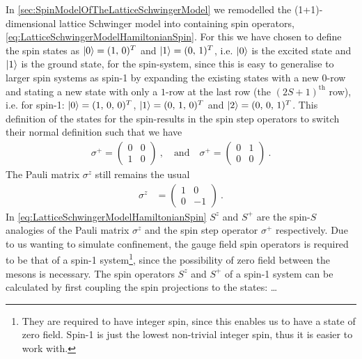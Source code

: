\documentclass[../main.tex]{subfiles} %
\begin{document}
In \cref{sec:SpinModelOfTheLatticeSchwingerModel} we remodelled the (1+1)-dimensional lattice Schwinger model into containing spin operators, \cref{eq:LatticeSchwingerModelHamiltonianSpin}.
For this we have chosen to define the spin states as $\ket{0} = (1,\, 0)^T$ and $\ket{1} = (0,\, 1)^T$, i.e. $\ket{0}$ is the excited state and $\ket{1}$ is the ground state, for the spin-\half system, since this is easy to generalise to larger spin systems as spin-1 by expanding the existing states with a new $0$-row and stating a new state with only a $1$-row at the last row (the $(2S+1)^\mathrm{th}$ row), i.e. for spin-1: $\ket{0} = (1,\, 0,\, 0)^T$, $\ket{1} = (0,\, 1,\, 0)^T$ and $\ket{2} = (0,\, 0,\, 1)^T$. This definition of the states for the spin-\half results in the spin step operators to switch their normal definition such that we have
\begin{align} \label{eq:StepOperatorsSpin1/2}
    \sigma^+ = \begin{pmatrix} 0 & 0 \\ 1 & 0 \end{pmatrix} \: , \quad \text{and} \quad
    \sigma^+ = \begin{pmatrix} 0 & 1 \\ 0 & 0 \end{pmatrix} \: .
\end{align}
The Pauli matrix $\sigma^z$ still remains the usual
\begin{align} \label{eq:PauliZOperatorSpin1/2}
    \sigma^z &= \begin{pmatrix} 1 & 0 \\ 0 & -1 \end{pmatrix} \: .
\end{align}
In \cref{eq:LatticeSchwingerModelHamiltonianSpin} $S^z$ and $S^+$ are the spin-$S$ analogies of the Pauli matrix $\sigma^z$ and the spin step operator $\sigma^+$ respectively. Due to us wanting to simulate confinement, the gauge field spin operators is required to be that of a spin-1 system\footnote{They are required to have integer spin, since this enables us to have a state of zero field. Spin-1 is just the lowest non-trivial integer spin, thus it is easier to work with.}, since the possibility of zero field between the mesons is necessary. The spin operators $S^z$ and $S^+$ of a spin-1 system can be calculated by first coupling the spin projections to the states: \ldots
\end{document}
